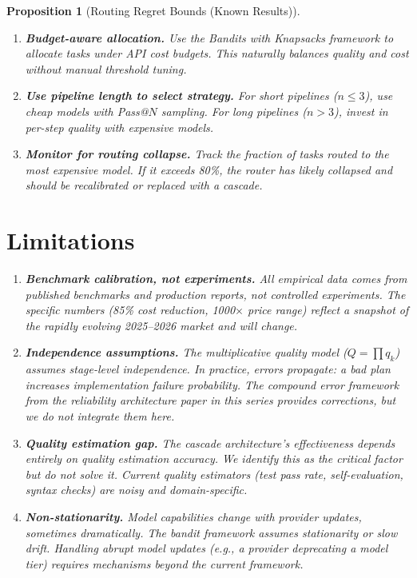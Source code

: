\documentclass[11pt, a4paper, copyright]{googledeepmind}
\newtheorem{proposition}{Proposition}[section]
\begin{document}
\begin{proposition}[Routing Regret Bounds (Known Results)]
\begin{enumerate}
\item \textbf{Budget-aware allocation.} Use the Bandits with Knapsacks framework to allocate tasks under API cost budgets. This naturally balances quality and cost without manual threshold tuning.

\item \textbf{Use pipeline length to select strategy.} For short pipelines ($n \leq 3$), use cheap models with Pass@$N$ sampling. For long pipelines ($n > 3$), invest in per-step quality with expensive models.

\item \textbf{Monitor for routing collapse.} Track the fraction of tasks routed to the most expensive model. If it exceeds 80\%, the router has likely collapsed and should be recalibrated or replaced with a cascade.
\end{enumerate}


\section{Limitations}
\label{sec:limitations}

\begin{enumerate}
\item \textbf{Benchmark calibration, not experiments.} All empirical data comes from published benchmarks and production reports, not controlled experiments. The specific numbers (85\% cost reduction, 1000$\times$ price range) reflect a snapshot of the rapidly evolving 2025--2026 market and will change.

\item \textbf{Independence assumptions.} The multiplicative quality model ($Q = \prod q_k$) assumes stage-level independence. In practice, errors propagate: a bad plan increases implementation failure probability. The compound error framework from the reliability architecture paper in this series provides corrections, but we do not integrate them here.

\item \textbf{Quality estimation gap.} The cascade architecture's effectiveness depends entirely on quality estimation accuracy. We identify this as the critical factor but do not solve it. Current quality estimators (test pass rate, self-evaluation, syntax checks) are noisy and domain-specific.

\item \textbf{Non-stationarity.} Model capabilities change with provider updates, sometimes dramatically. The bandit framework assumes stationarity or slow drift. Handling abrupt model updates (e.g., a provider deprecating a model tier) requires mechanisms beyond the current framework.


\end{enumerate}
\end{proposition}
\end{document}
